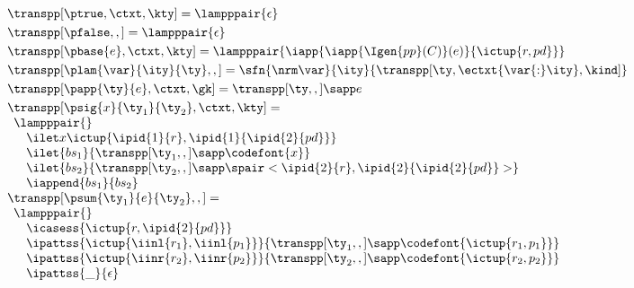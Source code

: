 \begin{figure*}
\[
\begin{array}{l}
\transpp[\ptrue,\ctxt,\kty] =
  \lampppair{\epsilon}
\\[3pt] %
\transpp[\pfalse,,] =
  \lampppair{\epsilon}
\\[3pt] %
\transpp[\pbase{e},\ctxt,\kty] =
  \lampppair{\iapp {\iapp {\Igen{pp}(C)} (e)} {\ictup {r,pd}}}
\\[3pt] %
\transpp[\plam{\var}{\ity}{\ty},,] =
   \sfn{\nrm\var}{\ity}{\transpp[\ty,\ectxt{\var{:}\ity},\kind]}
\\[3pt] %
\transpp[\papp{\ty}{e},\ctxt,\gk] =
  \transpp[\ty,,] \sapp e  
\\[3pt]
\transpp[\psig{x}{\ty_1}{\ty_2},\ctxt,\kty] = \\
  \begin{array}{l}  
    \lampppair{} \\
      \quad  \ilet x {\ictup{\ipid{1}{r},\ipid{1}{\ipid{2}{pd}}}}\\
      \quad  \ilet {bs_1} 
      {{\transpp[\ty_1,,]} \sapp \codefont{x}} \\
      \quad  \ilet {bs_2} 
      {{\transpp[\ty_2,,]} \sapp \spair<\ipid{2}{r},\ipid{2}{\ipid{2}{pd}}>} \\
      \quad \iappend{bs_1}{bs_2}
  \end{array}  
\\
  \transpp[\psum{\ty_1}{e}{\ty_2},,] = \\
  \begin{array}{l}  
  \lampppair{} \\
  \quad \icasess {\ictup{r,\ipid{2}{pd}}} \\
  \quad \ipattss{\ictup{\iinl{r_1}, \iinl{p_1}}} 
	{ {\transpp[\ty_1,,]} \sapp \codefont{\ictup{r_1,p_1}}}\\
  \quad \ipattss{\ictup{\iinr{r_2}, \iinr{p_2}}} 
	{ {\transpp[\ty_2,,]} \sapp \codefont{\ictup{r_2,p_2}}}\\
  \quad \ipattss{\_}  {\epsilon}\\

\end{array}
\end{array}\]
\end{figure*}
